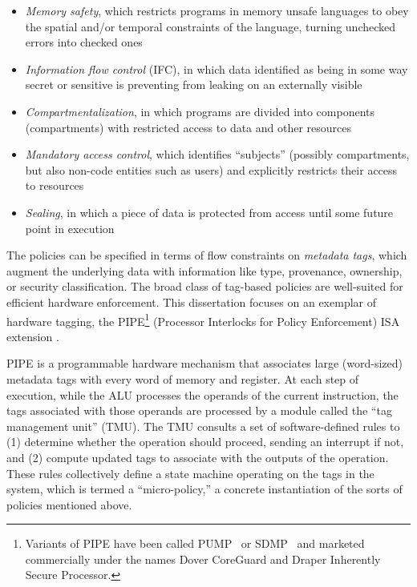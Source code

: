 \documentclass{report}
\begin{document}
\begin{itemize}
\item {\em Memory safety}, which restricts programs in memory unsafe languages to obey
  the spatial and/or temporal constraints of the language, turning unchecked errors into
  checked ones
\item {\em Information flow control} (IFC), in which data identified as being in some way secret
  or sensitive is preventing from leaking on an externally visible
\item {\em Compartmentalization}, in which programs are divided into components (compartments)
  with restricted access to data and other resources
\item {\em Mandatory access control}, which identifies ``subjects'' (possibly compartments,
  but also non-code entities such as users) and explicitly restricts their access to resources
\item {\em Sealing}, in which a piece of data is protected from access until some future
  point in execution
\end{itemize}

The policies can be specified in terms of flow constraints on \emph{metadata tags},
which augment the underlying data with information like type, provenance, ownership, or
security classification. The broad class of tag-based policies are well-suited for efficient
hardware enforcement. This dissertation focuses on an exemplar of hardware tagging, the
PIPE\footnote{ Variants of PIPE have
been called PUMP~\cite{Dhawan+15} or SDMP~\cite{RoesslerD18} and marketed commercially
under the names Dover CoreGuard and Draper Inherently Secure Processor.}
(Processor Interlocks for Policy Enforcement) ISA extension \cite{Azevedo+16,Azevedo+15}.

PIPE is a programmable hardware mechanism that associates large (word-sized) metadata tags
with every word of memory and register. At each step of execution, while the ALU processes
the operands of the current instruction, the tags associated with those operands are processed
by a module called the ``tag management unit'' (TMU).
The TMU consults a set of software-defined rules to (1) determine whether the operation should
proceed, sending an interrupt if not, and (2) compute updated tags to associate with the
outputs of the operation. These rules collectively define a state machine operating on the
tags in the system, which is termed a ``micro-policy,'' a concrete instantiation of the
sorts of policies mentioned above.
\end{document}
